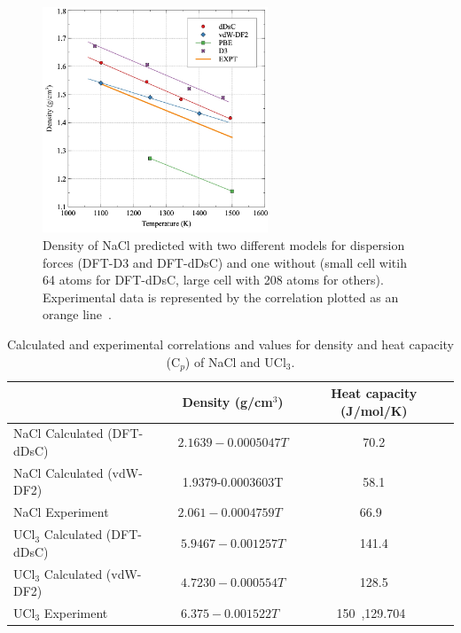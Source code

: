 \documentclass[preprint,3p,10pt,onecolumn,number,sort&compress]{elsarticle}
\begin{document}
{\begin{figure}[htb]
\centering
\includegraphics[width=0.6\textwidth]{fig4.jpg}
\caption{Density of NaCl predicted with two different models for dispersion forces (DFT-D3 and DFT-dDsC) and one without (small cell witih 64 atoms for DFT-dDsC, large cell with 208 atoms for others). Experimental data is represented by the correlation plotted as an orange line~\cite{Janz1988}.} %
\label{fig:NaCldensity}
\end{figure}

\begin{table}[hb!]
\centering
\begin{tabular}{lcc}
\hline
\hline
& Density (g/cm$^3$) &Heat capacity (J/mol/K) \\
\hline
NaCl Calculated (DFT-dDsC)	&$2.1639-0.0005047T$ &70.2 \\
NaCl Calculated (vdW-DF2)	& 1.9379-0.0003603T & 58.1 \\
NaCl Experiment	&$2.061-0.0004759T$~\cite{Janz1988} &66.9~\cite{NIST} \\	
UCl$_3$ Calculated (DFT-dDsC) &$5.9467-0.001257T$ &141.4 \\	
UCl$_3$ Calculated (vdW-DF2) &$4.7230-0.000554T$ & 128.5 \\	
UCl$_3$ Experiment	&$6.375-0.001522T$~\cite{Desyatnik} &150~\cite{BENES2008},129.704~\cite{YIN2020} \\
\hline
\hline
\end{tabular}
\caption{Calculated and experimental correlations and values for density and heat capacity (C$_p$) of NaCl and UCl$_3$. }%
\label{table:NaCldensityetc}
\end{table}

}
\end{document}
